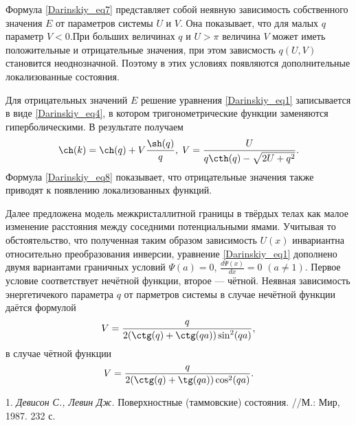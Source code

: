 Формула \eqref{Darinskiy_eq7}  представляет собой неявную зависимость собственного значения $E$ от параметров
системы $U$ и $V$. Она показывает, что для малых $q$ параметр $V<0$.При больших величинах $q$ и $U>\pi$ величина $V$
может иметь положительные и отрицательные значения, при этом зависмость $q(U,V)$ становится
неоднозначной. Поэтому в этих условиях появляются  дополнительные локализованные состояния.
\par Для отрицательных значений $E$ решение уравнения \eqref{Darinskiy_eq1} записывается в виде \eqref{Darinskiy_eq4}, в котором тригонометрические функции заменяются гиперболическими.
В результате получаем
\begin{multline} \label{Darinskiy_eq8}
\ch(k)=\ch(q)+V\frac{\sh(q)}{q},\;V=\frac{U}{q\cth(q)-\sqrt{2U+q^2}}.
\end{multline}
Формула \eqref{Darinskiy_eq8} показывает, что отрицательные значения также приводят к появлению локализованных функций.
\par Далее предложена модель межкристаллитной границы в твёрдых телах как малое изменение расстояния между соседними потенциальными ямами. Учитывая то обстоятельство, что полученная таким образом зависимость $U(x)$
инвариантна относительно преобразования инверсии, уравнение \eqref{Darinskiy_eq1} дополнено двумя вариантами граничных условий
$\Psi(a)=0$, $\frac{d\Psi(x)}{dx}=0$ $(a\neq1)$. Первое условие соответствует
нечётной функции, второе — чётной. Неявная зависимость энергетичекого параметра $q$ от парметров системы в случае нечётной функции даётся формулой
\begin{equation*}
V=\frac{q}{2(\ctg(q)+\ctg(qa))\sin^2(qa)},
\end{equation*}
в случае чётной функции
\begin{equation*}
V=\frac{q}{2(\ctg(q)+\tg(qa))\cos^2(qa)}.
\end{equation*}
\litlist

1. {\it Девисон С., Левин Дж.} Поверхностные (таммовские) состояния. //М.: Мир, 1987. 232 с.
